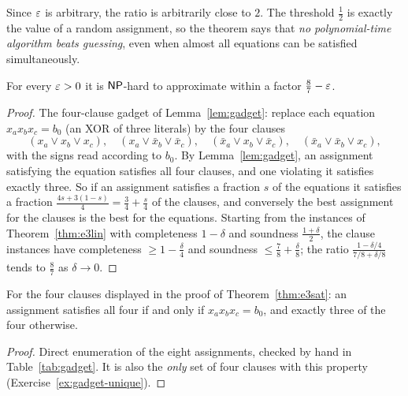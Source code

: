 \noindent
Since $\varepsilon$ is arbitrary, the ratio is arbitrarily close to $2$.  The threshold $\tfrac12$ is exactly the value of a random assignment, so the theorem says that \emph{no polynomial-time algorithm beats guessing}, even when almost all equations can be satisfied simultaneously.

\begin{theorem}\label{thm:e3sat}
For every $\varepsilon>0$ it is $\mathsf{NP}$-hard to approximate  within a factor $\tfrac87-\varepsilon$.
\end{theorem}
\begin{proof}
The four-clause gadget of Lemma~\ref{lem:gadget}: replace each equation $x_ax_bx_c=b_0$ (an XOR of three literals) by the four clauses
\[
  (x_a\vee x_b\vee x_c),\quad (x_a\vee\bar x_b\vee\bar x_c),\quad (\bar x_a\vee x_b\vee\bar x_c),\quad (\bar x_a\vee\bar x_b\vee x_c),
\]
with the signs read according to $b_0$.
By Lemma~\ref{lem:gadget}, an assignment satisfying the equation satisfies all four clauses, and one violating it satisfies exactly three.  So if an assignment satisfies a fraction $s$ of the equations it satisfies a fraction $\tfrac{4s+3(1-s)}{4}=\tfrac34+\tfrac s4$ of the clauses, and conversely the best assignment for the clauses is the best for the equations.
Starting from the instances of Theorem~\ref{thm:e3lin} with completeness $1-\delta$ and soundness $\tfrac{1+\delta}{2}$, the clause instances have completeness $\ge1-\tfrac\delta4$ and soundness $\le\tfrac78+\tfrac\delta8$; the ratio $\frac{1-\delta/4}{7/8+\delta/8}$ tends to $\tfrac87$ as $\delta\to0$.
\end{proof}

\begin{lemma}\label{lem:gadget}
For the four clauses displayed in the proof of Theorem~\ref{thm:e3sat}: an assignment satisfies all four if and only if $x_ax_bx_c=b_0$, and exactly three of the four otherwise.
\end{lemma}
\begin{proof}
Direct enumeration of the eight assignments, checked by hand in Table~\ref{tab:gadget}.  It is also the \emph{only} set of four clauses with this property (Exercise~\ref{ex:gadget-unique}).
\end{proof}

